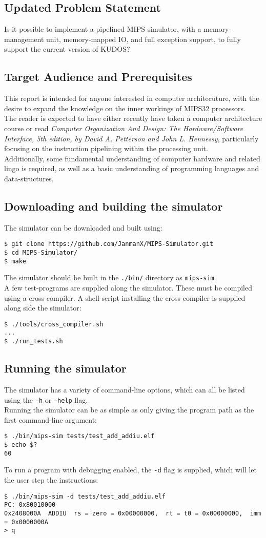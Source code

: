 \subsection*{Updated Problem Statement}
Is it possible to implement a pipelined MIPS simulator, with a memory-management
unit, memory-mapped IO, and full exception support, to fully support the
current version of KUDOS?

\subsection*{Target Audience and Prerequisites}
This report is intended for anyone interested in computer architecuture, with
the desire to expand the knowledge on the inner workings of MIPS32 processors.\\
The reader is expected to have either recently have taken a computer architecture course
or read \textit{Computer Organization And Design: The Hardware/Software Interface, 5th
edition, by David A. Petterson and John L. Hennessy}, particularly focusing on
the instruction pipelining within the processing unit.\\
Additionally, some fundamental understanding of computer hardware and related lingo is required,
as well as a basic understanding of programming languages and data-structures.

\subsection*{Downloading and building the simulator}
The simulator can be downloaded and built using:
\begin{verbatim}
$ git clone https://github.com/JanmanX/MIPS-Simulator.git
$ cd MIPS-Simulator/
$ make
\end{verbatim}
The simulator should be built in the \texttt{./bin/} directory as \texttt{mips-sim}.\\
A few test-programs are supplied along the simulator. These must be compiled
using a cross-compiler. A shell-script installing the cross-compiler is supplied
along side the simulator:
\begin{verbatim}
$ ./tools/cross_compiler.sh
...
$ ./run_tests.sh
\end{verbatim}
\subsection*{Running the simulator}
The simulator has a variety of command-line options, which can all be listed
using the \texttt{-h} or \texttt{--help} flag.\\
Running the simulator can be as simple as only giving the program path as the first
command-line argument:
\begin{verbatim}
$ ./bin/mips-sim tests/test_add_addiu.elf
$ echo $?
60
\end{verbatim}
To run a program with debugging enabled, the \texttt{-d} flag is supplied, which
will let the user step the instructions:
\begin{verbatim}
$ ./bin/mips-sim -d tests/test_add_addiu.elf
PC: 0x80010000
0x2408000A	ADDIU  rs = zero = 0x00000000,  rt = t0 = 0x00000000,  imm = 0x0000000A
> q
\end{verbatim}
